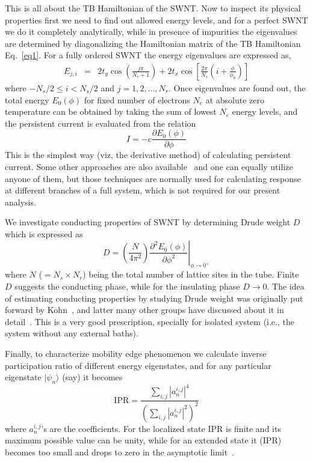 \documentclass[prb,aps,twocolumn,amsmath,amssymb,floatfix,
superscriptaddress]{revtex4}
\begin{document}
This is all about the TB Hamiltonian of the SWNT. Now to inspect its physical
properties first we need to find out allowed energy levels, and for a perfect
SWNT we do it completely analytically, while in presence of impurities the
eigenvalues are determined by diagonalizing the Hamiltonian matrix of the TB
Hamiltonian Eq.~\ref{eq1}. For a fully ordered SWNT the energy eigenvalues 
are expressed as,
\begin{eqnarray}
E_{j,i} &=& 2t_y \cos\left(\frac{j\pi}{N_r + 1}\right)  
+ 2 t_x \cos \left[\frac{2\pi}{N_s} \left(i + \frac{\phi}{\phi_0}\right) 
\right]
\label{eq2}
\end{eqnarray}
where $-N_s/2 \le i < N_s/2$ and $j = 1,2,\dots, N_r$. Once eigenvalues
are found out, the total energy $E_0(\phi)$ for fixed number of electrons 
$N_e$ at absolute zero temperature can be obtained by taking the sum of
lowest $N_e$ energy levels, and the persistent current is evaluated from
the relation~\cite{pc2} 
\begin{equation}
I = -c\frac{\partial E_0(\phi)}{\partial \phi}
\label{eq3}
\end{equation}
This is the simplest way (viz, the derivative method) of calculating persistent 
current. Some other approaches are also available~\cite{skm2} and one can 
equally utilize anyone of them, but those techniques are normally used for
calculating response at different branches of a full system, which is not 
required for our present analysis. 

We investigate conducting properties of SWNT by determining Drude weight
$D$ which is expressed as~\cite{kohn,bouz}
\begin{equation}
D = \left.\left(\frac{N}{4\pi^2}\right) 
\frac{\partial^2 E_0(\phi)}{\partial\phi^2} \right\vert_{\phi\rightarrow 0^+}
\label{eq4}  
\end{equation}
where $N$ ($=N_s\times N_r$) being the total number of lattice sites in the tube.
Finite $D$ suggests the conducting phase, while for the insulating phase
$D\rightarrow 0$. The idea of estimating conducting properties by studying
Drude weight was originally put forward by Kohn~\cite{kohn}, and latter many 
other groups have discussed about it in detail~\cite{sca1,sca2}. This is a 
very good prescription, specially for isolated system (i.e., the system without 
any external baths).

Finally, to characterize mobility edge phenomenon we calculate inverse 
participation ratio of different energy eigenstates, and for any particular 
eigenstate $|\psi_n\rangle$ (say) it becomes~\cite{das2}
\begin{equation}
\mbox{IPR}=\frac{\sum\limits_{i,j} |a_n^{i,j}|^4}{\left(\sum\limits_{i,j}
|a_n^{i,j}|^2\right)^2}
\label{eq5}
\end{equation}
where $a_n^{i,j}$'s are the coefficients. For the localized state IPR is 
finite and its maximum possible value can be unity, while for an extended 
state it (IPR) becomes too small and drops to zero in the asymptotic 
limit~\cite{das2}.
\end{document}
